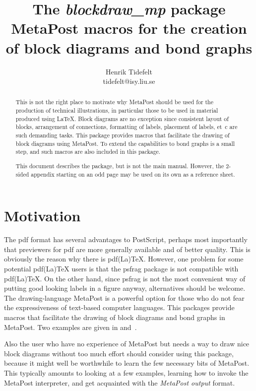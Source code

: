 \documentclass{ltxdoc}
\title{The \emph{blockdraw\_{}mp} package\\
{\large MetaPost macros for the creation of block diagrams and bond graphs}}
\author{Henrik Tidefelt\\
{\small tidefelt@isy.liu.se}}
\begin{document}
\maketitle

\begin{abstract}
This is not the right place to motivate why MetaPost should be used for the production of technical illustrations, in particular those to be used in material produced using \LaTeX{}.  Block diagrams are no exception since consistent layout of blocks, arrangement of connections, formatting of labels, placement of labels, et~c{} are such demanding tasks.  This package provides macros that facilitate the drawing of block diagrams using MetaPost.  To extend the capabilities to bond graphs is a small step, and such macros are also included in this package.

This document describes the package, but is not the main manual.  However, the $2$-sided appendix starting on an odd page may be used on its own as a reference sheet.
\end{abstract}

\tableofcontents

\newpage

\section{Motivation}%
%
The pdf format has several advantages to PostScript, perhaps most importantly that previewers for pdf are more generally available and of better quality. This is obviously the reason why there is pdf(La)\TeX{}.  However, one problem for some potential pdf(La)\TeX{} users is that the psfrag package is not compatible with pdf(La)\TeX{}.  On the other hand, since psfrag is not the most convenient way of putting good looking labels in a figure anyway, alternatives should be welcome.  The drawing-language MetaPost is a powerful option for those who do not fear the expressiveness of text-based computer languages.  This packages provide macros that facilitate the drawing of block diagrams and bond graphs in MetaPost.  Two examples are given in  and~.

Also the user who have no experience of MetaPost but needs a way to draw nice block diagrams without too much effort should consider using this package, because it might well be worthwhile to learn the few necessary bits of MetaPost.  This typically amounts to looking at a few examples, learning how to invoke the MetaPost interpreter, and get acquainted with the \emph{MetaPost output} format.
\end{document}
